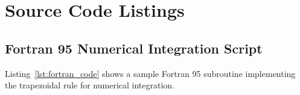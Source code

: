 
%
%

\chapter{Source Code Listings}
\label{app:code}

\section{Fortran 95 Numerical Integration Script}
Listing~\ref{lst:fortran_code} shows a sample Fortran 95 subroutine implementing the trapezoidal rule for numerical integration.

